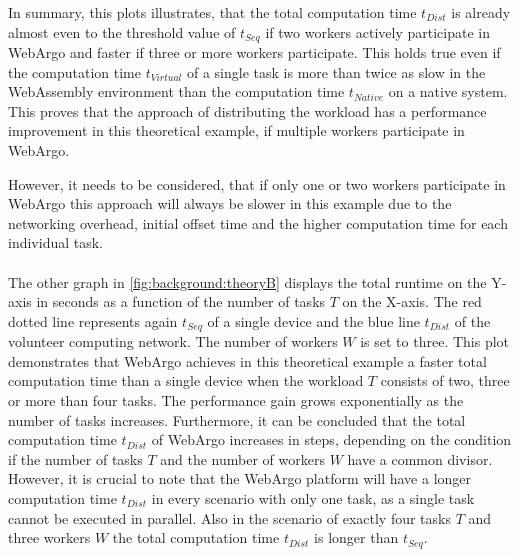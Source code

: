 In summary, this plots illustrates, that the total computation time $t_{Dist}$ is already almost even to the threshold value of $t_{Seq}$ if two workers actively participate in WebArgo and faster if three or more workers participate. This holds true even if the computation time $t_{Virtual}$ of a single task is more than twice as slow in the WebAssembly environment than the computation time $t_{Native}$ on a native system. This proves that the approach of distributing the workload has a performance improvement in this theoretical example, if multiple workers participate in WebArgo. 

However, it needs to be considered, that if only one or two workers participate in WebArgo this approach will always be slower in this example due to the networking overhead, initial offset time and the higher computation time for each individual task.
\\~\\
The other graph in \autoref{fig:background:theoryB} displays the total runtime on the Y-axis in seconds as a function of the number of tasks $T$ on the X-axis. The red dotted line represents again $t_{Seq}$ of a single device and the blue line $t_{Dist}$ of the volunteer computing network. The number of workers $W$ is set to three. This plot demonstrates that WebArgo achieves in this theoretical example a faster total computation time than a single device when the workload $T$ consists of two, three or more than four tasks. The performance gain grows exponentially as the number of tasks increases. Furthermore, it can be concluded that the total computation time $t_{Dist}$ of WebArgo increases in steps, depending on the condition if the number of tasks $T$ and the number of workers $W$ have a common divisor. However, it is crucial to note that the WebArgo platform will have a longer computation time $t_{Dist}$ in every scenario with only one task, as a single task cannot be executed in parallel. Also in the scenario of exactly four tasks $T$ and three workers $W$ the total computation time $t_{Dist}$ is longer than $t_{Seq}$.